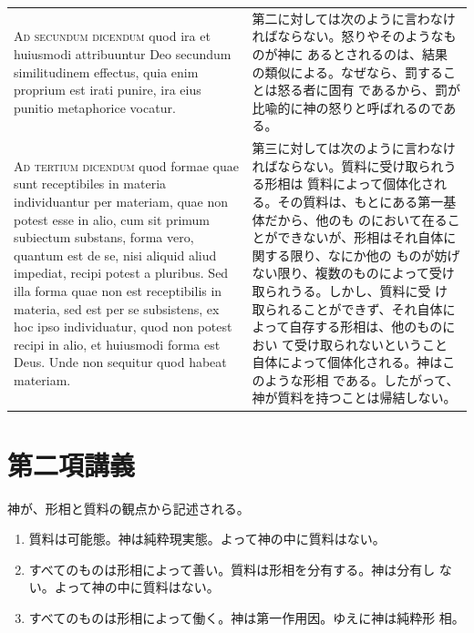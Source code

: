 \documentclass[paper=a4paper,fontsize=10pt,jafontsize=9pt,titlepage]{jlreq}
\begin{document}
\begin{longtable}{p{21em}p{21em}}
\textsc{Ad secundum dicendum} quod ira et huiusmodi attribuuntur Deo
 secundum similitudinem effectus, quia enim proprium est irati punire,
 ira eius punitio metaphorice vocatur.

&

第二に対しては次のように言わなければならない。怒りやそのようなものが神に
 あるとされるのは、結果の類似による。なぜなら、罰することは怒る者に固有
 であるから、罰が比喩的に神の怒りと呼ばれるのである。


\\


\textsc{Ad tertium dicendum} quod formae quae sunt receptibiles in
 materia individuantur per materiam, quae non potest esse in alio, cum
 sit primum subiectum substans, forma vero, quantum est de se, nisi
 aliquid aliud impediat, recipi potest a pluribus. Sed illa forma quae
 non est receptibilis in materia, sed est per se subsistens, ex hoc ipso
 individuatur, quod non potest recipi in alio, et huiusmodi forma est
 Deus. Unde non sequitur quod habeat materiam.

&

第三に対しては次のように言わなければならない。質料に受け取られうる形相は
 質料によって個体化される。その質料は、もとにある第一基体だから、他のも
 のにおいて在ることができないが、形相はそれ自体に関する限り、なにか他の
 ものが妨げない限り、複数のものによって受け取られうる。しかし、質料に受
 け取られることができず、それ自体によって自存する形相は、他のものにおい
 て受け取られないということ自体によって個体化される。神はこのような形相
 である。したがって、神が質料を持つことは帰結しない。



\end{longtable}

\section{第二項講義}

神が、形相と質料の観点から記述される。
\begin{enumerate}
 \item 質料は可能態。神は純粋現実態。よって神の中に質料はない。
 \item すべてのものは形相によって善い。質料は形相を分有する。神は分有し
       ない。よって神の中に質料はない。
 \item すべてのものは形相によって働く。神は第一作用因。ゆえに神は純粋形
       相。
\end{enumerate}
\end{document}

